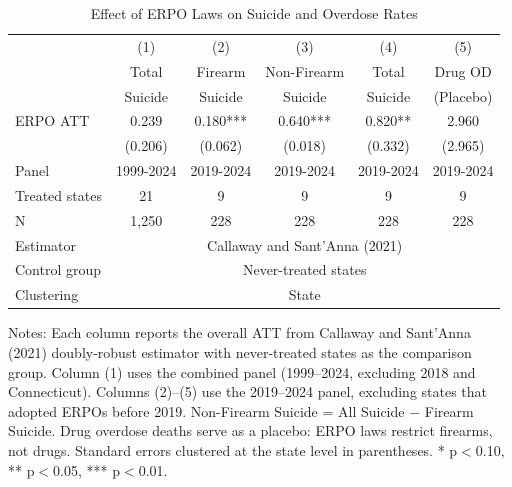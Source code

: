 \begin{table}[H]
\centering
\caption{Effect of ERPO Laws on Suicide and Overdose Rates}
\label{tab:main}
\begin{threeparttable}
\begin{tabular}{lccccc}
\toprule
 & (1) & (2) & (3) & (4) & (5) \\
 & Total & Firearm & Non-Firearm & Total & Drug OD \\
 & Suicide & Suicide & Suicide & Suicide & (Placebo) \\
\midrule
ERPO ATT & 0.239 & 0.180*** & 0.640*** & 0.820** & 2.960 \\
 & (0.206) & (0.062) & (0.018) & (0.332) & (2.965) \\
\addlinespace
Panel & 1999-2024 & 2019-2024 & 2019-2024 & 2019-2024 & 2019-2024 \\
Treated states & 21 & 9 & 9 & 9 & 9 \\
\addlinespace
N & 1,250 & 228 & 228 & 228 & 228 \\
Estimator & \multicolumn{5}{c}{Callaway and Sant'Anna (2021)} \\
Control group & \multicolumn{5}{c}{Never-treated states} \\
Clustering & \multicolumn{5}{c}{State} \\
\bottomrule
\end{tabular}
\begin{tablenotes}[flushleft]
\small
\item Notes: Each column reports the overall ATT from Callaway and Sant'Anna (2021) doubly-robust estimator with never-treated states as the comparison group. Column (1) uses the combined panel (1999--2024, excluding 2018 and Connecticut). Columns (2)--(5) use the 2019--2024 panel, excluding states that adopted ERPOs before 2019. Non-Firearm Suicide = All Suicide $-$ Firearm Suicide. Drug overdose deaths serve as a placebo: ERPO laws restrict firearms, not drugs. Standard errors clustered at the state level in parentheses. * p$<$0.10, ** p$<$0.05, *** p$<$0.01.
\end{tablenotes}
\end{threeparttable}
\end{table}
